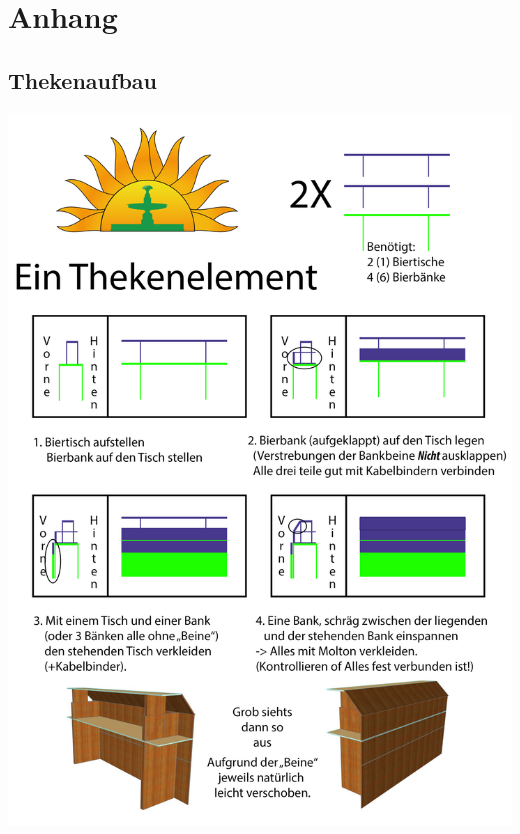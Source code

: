 \cleardoublepage
\section{Anhang}
\subsection{Thekenaufbau}
\includegraphics[width=.95\textwidth]{theke.jpg}
